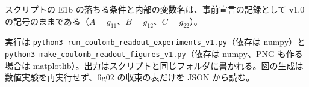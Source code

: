 \documentclass[
  a4paper,
]{ltjsarticle}
\begin{document}
スクリプトの E1b の落ちる条件と内部の変数名は、事前宣言の記録として v1.0
の記号のままである（\(A=g_{11}\)、\(B=g_{12}\)、\(C=g_{22}\)）。

実行は
\texttt{python3\ run\_coulomb\_readout\_experiments\_v1.py}（依存は
numpy）と
\texttt{python3\ make\_coulomb\_readout\_figures\_v1.py}（依存は
numpy、PNG も作る場合は
matplotlib）。出力はスクリプトと同じフォルダに書かれる。図の生成は数値実験を再実行せず、fig02
の収束の表だけを JSON から読む。
\end{document}
